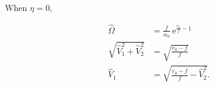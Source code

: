 \noindent When $\eta = 0$,

\begin{equation}  \label{eq:two-traits-finals3}
\begin{split}
    \hat{\Omega} &= \frac{ f }{ \alpha_0 } ~ \textrm{e}^{\frac{ r_0 }{ f } - 1 } \\
    \sqrt{\hat{V}_1^2 + \hat{V}_2^2} &= \sqrt{ \frac{ r_0 - f }{ f } } \\
    \hat{V}_1 &= \sqrt{ \frac{ r_0 - f }{ f } - \hat{V}_2^2 }
    \textrm{.}
\end{split}
\end{equation}
